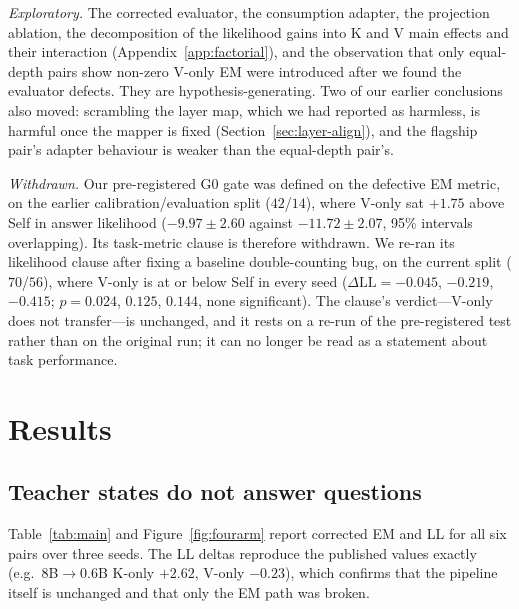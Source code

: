 \documentclass[11pt]{article}
\newcommand{\dll}{\Delta\text{LL}}
\begin{document}
\emph{Exploratory.} The corrected evaluator, the consumption adapter, the
projection ablation, the decomposition of the likelihood gains into K and V main
effects and their interaction (Appendix~\ref{app:factorial}), and the observation
that only equal-depth pairs show non-zero V-only EM were introduced after we
found the evaluator defects.
They are hypothesis-generating. Two of our earlier conclusions also moved:
scrambling the layer map, which we had reported as harmless, is harmful once the
mapper is fixed (Section~\ref{sec:layer-align}), and the flagship pair's adapter behaviour is
weaker than the equal-depth pair's.

\emph{Withdrawn.} Our pre-registered G0 gate was defined on the defective EM
metric, on the earlier calibration/evaluation split ($42$/$14$), where V-only
sat $+1.75$ above Self in answer likelihood ($-9.97 \pm 2.60$ against
$-11.72 \pm 2.07$, 95\% intervals overlapping). Its task-metric clause is
therefore withdrawn. We re-ran its likelihood clause after fixing a baseline
double-counting bug, on the current split ($70$/$56$), where V-only is at or
below Self in every seed ($\dll = -0.045$, $-0.219$, $-0.415$; $p = 0.024$,
$0.125$, $0.144$, none significant). The clause's verdict---V-only does not
transfer---is unchanged, and it rests on a re-run of the pre-registered test
rather than on the original run; it can no longer be read as a statement about
task performance.
\section{Results}

\subsection{Teacher states do not answer questions}
\label{sec:teacher-states}
Table~\ref{tab:main} and Figure~\ref{fig:fourarm} report corrected EM and LL for
all six pairs over three seeds. The LL deltas reproduce the published values
exactly (e.g.\ $8$B$\to0.6$B K-only $+2.62$, V-only $-0.23$), which confirms that
the pipeline itself is unchanged and that only the EM path was broken.
\end{document}
